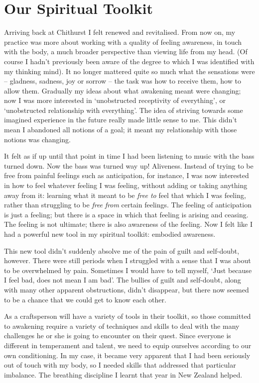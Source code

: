 \chapter{Our Spiritual Toolkit}

Arriving back at Chithurst I felt renewed and revitalised. From now on,
my practice was more about working with a quality of feeling awareness,
in touch with the body, a much broader perspective than viewing life
from my head. (Of course I hadn't previously been aware of the degree to
which I was identified with my thinking mind). It no longer mattered
quite so much what the sensations were -- gladness, sadness, joy or
sorrow -- the task was how to receive them, how to allow them. Gradually
my ideas about what awakening meant were changing; now I was more
interested in `unobstructed receptivity of everything', or `unobstructed
relationship with everything'. The idea of striving towards some
imagined experience in the future really made little sense to me. This
didn't mean I abandoned all notions of a goal; it meant my relationship
with those notions was changing.

It felt as if up until that point in time I had been listening to music
with the bass turned down. Now the bass was turned way up! Aliveness.
Instead of trying to be free from painful feelings such as anticipation,
for instance, I was now interested in how to feel whatever feeling I was
feeling, without adding or taking anything away from it: learning what
it meant to be \emph{free to} feel that which I was feeling, rather than
struggling to be \emph{free} \emph{from} certain feelings. The feeling
of anticipation is just a feeling; but there is a space in which that
feeling is arising and ceasing. The feeling is not ultimate; there is
also awareness of the feeling. Now I felt like I had a powerful new tool
in my spiritual toolkit: embodied awareness.

This new tool didn't suddenly absolve me of the pain of guilt and
self-doubt, however. There were still periods when I struggled with a
sense that I was about to be overwhelmed by pain. Sometimes I would have
to tell myself, `Just because I feel bad, does not mean I am bad'. The
bullies of guilt and self-doubt, along with many other apparent
obstructions, didn't disappear, but there now seemed to be a chance that
we could get to know each other.

As a craftsperson will have a variety of tools in their toolkit, so
those committed to awakening require a variety of techniques and skills
to deal with the many challenges he or she is going to encounter on
their quest. Since everyone is different in temperament and talent, we
need to equip ourselves according to our own conditioning. In my case,
it became very apparent that I had been seriously out of touch with my
body, so I needed skills that addressed that particular imbalance. The
breathing discipline I learnt that year in New Zealand helped.

